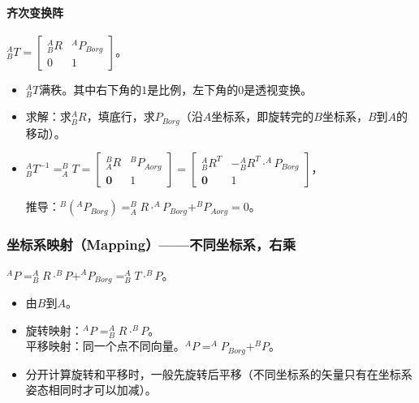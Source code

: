 \documentclass[
12pt, %
a4paper, 
oneside, %
headinclude,footinclude, %
]{scrartcl}
\begin{document}
\paragraph{齐次变换阵}
$ ^A_B T = \begin{bmatrix} ^A_B R & ^A P_{Borg} \\ 0 & 1 \end{bmatrix} $。
\begin{itemize}
\item $ ^A_B T $满秩。其中右下角的$ 1 $是比例，左下角的$ 0 $是透视变换。
\item 求解：求$ ^A_B R $，填底行，求$ P_{Borg} $（沿$ A $坐标系，即旋转完的$ B $坐标系，$ B $到$ A $的移动）。
\item 
$ 
^A_B T^{-1} = ^B_A T 
= \begin{bmatrix} ^B_A R & ^B P_{Aorg} \\ \mathbf{0} & 1 \end{bmatrix} 
= \begin{bmatrix} ^A_B R^T & -^A_B R^T \cdot ^A P_{Borg} \\ \mathbf{0} & 1 \end{bmatrix} 
$，

推导：$ ^B(^A P_{Borg}) = ^B_A R \cdot ^A P_{Borg} + ^B P_{Aorg} = 0 $。
\end{itemize}
\subsubsection{坐标系映射（Mapping）——不同坐标系，右乘}
$ ^A P = ^A_B R \cdot ^B P + ^A P_{Borg} = ^A_B T \cdot ^B P $。
\begin{itemize}
\item 由$ B $到$ A $。
\item 旋转映射：$ ^A P = ^A_B R \cdot ^B P $。 \\
平移映射：同一个点不同向量。$ ^A P = ^A P_{Borg} + ^B P $。
\item 分开计算旋转和平移时，一般先旋转后平移（不同坐标系的矢量只有在坐标系姿态相同时才可以加减）。
\end{itemize}
\end{document}
